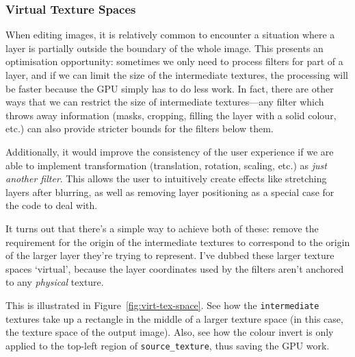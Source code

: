 \documentclass[12pt]{article}
\begin{document}
\subsubsection{Virtual Texture Spaces}\label{sec:virt-tex-spaces}

When editing images, it is relatively common to encounter a situation where a layer is partially
outside the boundary of the whole image.  This presents an optimisation opportunity: sometimes we
only need to process filters for part of a layer, and if we can limit the size of the intermediate
textures, the processing will be faster because the GPU simply has to do less work.  In fact, there
are other ways that we can restrict the size of intermediate textures---any filter which throws away
information (masks, cropping, filling the layer with a solid colour, etc.) can also provide stricter
bounds for the filters below them.

Additionally, it would improve the consistency of the user experience if we are able to implement
transformation (translation, rotation, scaling, etc.) as \emph{just another filter}.  This allows
the user to intuitively create effects like stretching layers after blurring, as well as removing
layer positioning as a special case for the code to deal with.

It turns out that there's a simple way to achieve both of these: remove the requirement for the
origin of the intermediate textures to correspond to the origin of the larger layer they're trying
to represent.  I've dubbed these larger texture spaces `virtual', because the layer coordinates used
by the filters aren't anchored to any \emph{physical} texture.

This is illustrated in Figure~\ref{fig:virt-tex-space}.  See how the \verb|intermediate| textures
take up a rectangle in the middle of a larger texture space (in this case, the texture space of the
output image).  Also, see how the colour invert is only applied to the top-left region of
\verb|source_texture|, thus saving the GPU work.
\end{document}

